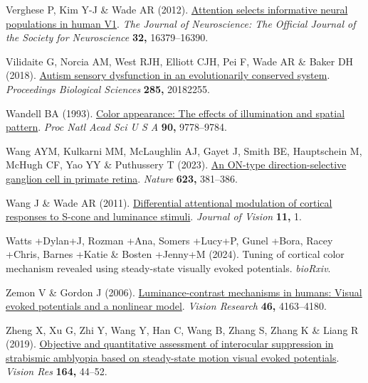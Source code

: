 \documentclass[
  letterpaper,
  DIV=11,
  numbers=noendperiod]{scrartcl}
\newlength{\cslhangindent}
\newenvironment{CSLReferences}[2] %
 {\begin{list}{}{%
  \setlength{\itemindent}{0pt}
  \setlength{\leftmargin}{0pt}
  \setlength{\parsep}{0pt}
  \ifodd #1
   \setlength{\leftmargin}{\cslhangindent}
   \setlength{\itemindent}{-1\cslhangindent}
  \fi
  \setlength{\itemsep}{#2\baselineskip}}}
 {\end{list}}
\begin{document}
\begin{CSLReferences}{1}{1}
Verghese P, Kim Y-J \& Wade AR (2012).
\href{https://doi.org/10.1523/JNEUROSCI.1174-12.2012}{Attention selects
informative neural populations in human {V1}}. \emph{The Journal of
Neuroscience: The Official Journal of the Society for Neuroscience}
\textbf{32,} 16379--16390.

Vilidaite G, Norcia AM, West RJH, Elliott CJH, Pei F, Wade AR \& Baker
DH (2018). \href{https://doi.org/10.1098/rspb.2018.2255}{Autism sensory
dysfunction in an evolutionarily conserved system}. \emph{Proceedings
Biological Sciences} \textbf{285,} 20182255.

Wandell BA (1993). \href{https://doi.org/10.1073/pnas.90.21.9778}{Color
appearance: The effects of illumination and spatial pattern}. \emph{Proc
Natl Acad Sci U S A} \textbf{90,} 9778--9784.

Wang AYM, Kulkarni MM, McLaughlin AJ, Gayet J, Smith BE, Hauptschein M,
McHugh CF, Yao YY \& Puthussery T (2023).
\href{https://doi.org/10.1038/s41586-023-06659-4}{An ON-type
direction-selective ganglion cell in primate retina}. \emph{Nature}
\textbf{623,} 381--386.

Wang J \& Wade AR (2011).
\href{https://doi.org/10.1167/11.6.1}{Differential attentional
modulation of cortical responses to {S}-cone and luminance stimuli}.
\emph{Journal of Vision} \textbf{11,} 1.

Watts +Dylan+J, Rozman +Ana, Somers +Lucy+P, Gunel +Bora, Racey +Chris,
Barnes +Katie \& Bosten +Jenny+M (2024). Tuning of cortical color
mechanism revealed using steady-state visually evoked potentials.
\emph{bioRxiv}.

Zemon V \& Gordon J (2006).
\href{https://doi.org/10.1016/j.visres.2006.07.007}{Luminance-contrast
mechanisms in humans: Visual evoked potentials and a nonlinear model}.
\emph{Vision Research} \textbf{46,} 4163--4180.

Zheng X, Xu G, Zhi Y, Wang Y, Han C, Wang B, Zhang S, Zhang K \& Liang R
(2019). \href{https://doi.org/10.1016/j.visres.2019.07.003}{Objective
and quantitative assessment of interocular suppression in strabismic
amblyopia based on steady-state motion visual evoked potentials}.
\emph{Vision Res} \textbf{164,} 44--52.

\end{CSLReferences}
\end{document}
